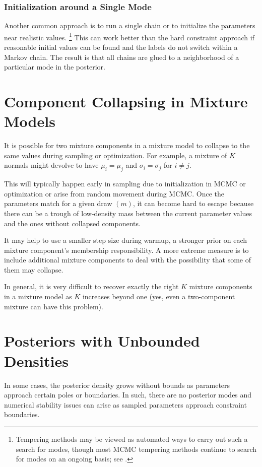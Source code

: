\subsubsection{Initialization around a Single Mode}

Another common approach is to run a single chain or to initialize the
parameters near realistic values.%
%
\footnote{Tempering methods may be viewed as automated ways to carry
  out such a search for modes, though most MCMC tempering methods
  continue to search for modes on an ongoing basis; see
  \citep{SwendsenWang:1986, Neal:1996b}.}
%
This can work better than the hard constraint approach if reasonable
initial values can be found and the labels do not switch within a
Markov chain.  The result is that all chains are glued to a
neighborhood of a particular mode in the posterior.

\section{Component Collapsing in Mixture Models}

It is possible for two mixture components in a mixture model to
collapse to the same values during sampling or optimization.  For
example, a mixture of $K$ normals might devolve to have $\mu_i =
\mu_j$ and $\sigma_i = \sigma_j$ for $i \neq j$.  

This will typically happen early in sampling due to initialization in
MCMC or optimization or arise from random movement during MCMC.  Once
the parameters match for a given draw $(m)$, it can become hard to
escape because there can be a trough of low-density mass between the
current parameter values and the ones without collapsed components.  

It may help to use a smaller step size during warmup, a stronger prior
on each mixture component's membership responsibility.  A more extreme
measure is to include additional mixture components to deal with the
possibility that some of them may collapse.

In general, it is very difficult to recover exactly the right $K$
mixture components in a mixture model as $K$ increases beyond one
(yes, even a two-component mixture can have this problem).


\section{Posteriors with Unbounded Densities}

In some cases, the posterior density grows without bounds as
parameters approach certain poles or boundaries.  In such, there
are no posterior modes and numerical stability issues can arise as
sampled parameters approach constraint boundaries.

